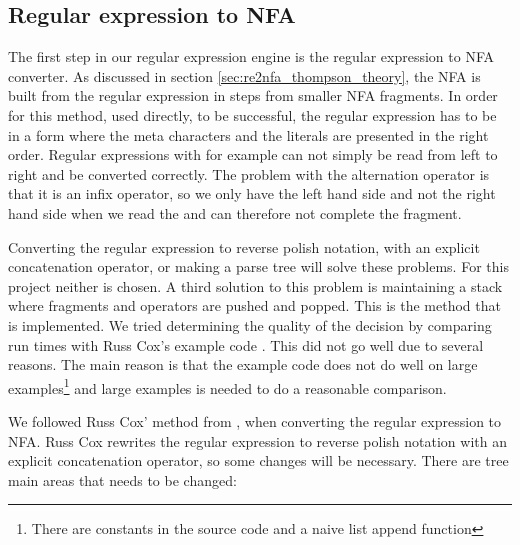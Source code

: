 \subsection{Regular expression to NFA}

The first step in our regular expression engine is the regular
expression to NFA converter. As discussed in section
\vref{sec:re2nfa_thompson_theory}, the NFA is built from the regular
expression in steps from smaller NFA fragments. In order for this
method, used directly, to be successful, the regular expression has to
be in a form where the meta characters and the literals are presented
in the right order. Regular expressions with for example
\textsf{\textbar} can not simply be read from left to right and be
converted correctly. The problem with the alternation operator is that
it is an infix operator, so we only have the left hand side and not
the right hand side when we read the \textsf{\textbar} and can
therefore not complete the fragment.

Converting the regular expression to reverse polish notation, with an
explicit concatenation operator, or making a parse tree will solve
these problems. For this project neither is chosen. A third solution
to this problem is maintaining a stack where fragments and operators
are pushed and popped. This is the method that is implemented. We
tried determining the quality of the decision by comparing run times
with Russ Cox's example code \cite{Cox2007}. This did not go well due
to several reasons. The main reason is that the example code does not
do well on large examples\footnote{There are constants in the source
  code and a naive list append function} and large examples is needed
to do a reasonable comparison.

We followed Russ Cox' method from \cite{RussCox}, when converting the
regular expression to NFA. Russ Cox rewrites the regular expression to
reverse polish notation with an explicit concatenation operator, so
some changes will be necessary. There are tree main areas that needs
to be changed:

